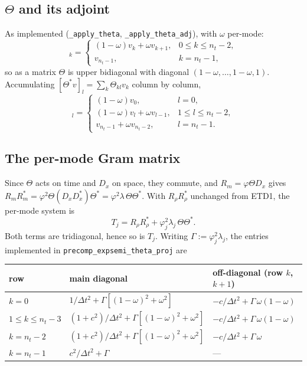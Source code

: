 \documentclass[11pt]{article}
\newcommand{\dt}{\Delta t}
\newcommand{\code}[1]{\texttt{#1}}
\begin{document}
\subsection{$\Theta$ and its adjoint}

As implemented (\code{\_apply\_theta}, \code{\_apply\_theta\_adj}), with $\omega$
per-mode:
\begin{equation}
  [\Theta v]_k =
  \begin{cases}
    (1-\omega)v_k + \omega v_{k+1}, & 0\le k\le n_t-2,\\[2pt]
    v_{n_t-1},                      & k=n_t-1,
  \end{cases}
  \label{eq:Theta}
\end{equation}
so as a matrix $\Theta$ is upper bidiagonal with diagonal
$(1-\omega,\dots,1-\omega,1)$. Accumulating $[\Theta^*v]_l=\sum_k\Theta_{kl}v_k$ column
by column,
\begin{equation}
  [\Theta^*v]_l =
  \begin{cases}
    (1-\omega)v_0,                        & l=0,\\[2pt]
    (1-\omega)v_l + \omega v_{l-1},       & 1\le l\le n_t-2,\\[2pt]
    v_{n_t-1} + \omega v_{n_t-2},         & l=n_t-1.
  \end{cases}
  \label{eq:ThetaStar}
\end{equation}

\subsection{The per-mode Gram matrix}

Since $\Theta$ acts on time and $D_x$ on space, they commute, and $R_m=\varphi\Theta D_x$
gives $R_mR_m^*=\varphi^2\Theta(D_xD_x^*)\Theta^*=\varphi^2\lambda\,\Theta\Theta^*$. With
$R_\rho R_\rho^*$ unchanged from ETD1, the per-mode system is
\begin{equation}
  T_j = R_\rho R_\rho^* + \varphi_j^2\lambda_j\,\Theta\Theta^* .
  \label{eq:gram}
\end{equation}
Both terms are tridiagonal, hence so is $T_j$. Writing $\Gamma:=\varphi_j^2\lambda_j$,
the entries implemented in \code{precomp\_expsemi\_theta\_proj} are

\begin{center}
\begin{tabular}{@{}lll@{}}
\toprule
row & main diagonal & off-diagonal (row $k$, $k{+}1$) \\
\midrule
$k=0$              & $1/\dt^2 + \Gamma[(1-\omega)^2+\omega^2]$
                   & $-c/\dt^2 + \Gamma\,\omega(1-\omega)$ \\
$1\le k\le n_t-3$  & $(1+c^2)/\dt^2 + \Gamma[(1-\omega)^2+\omega^2]$
                   & $-c/\dt^2 + \Gamma\,\omega(1-\omega)$ \\
$k=n_t-2$          & $(1+c^2)/\dt^2 + \Gamma[(1-\omega)^2+\omega^2]$
                   & $-c/\dt^2 + \Gamma\,\omega$ \\
$k=n_t-1$          & $c^2/\dt^2 + \Gamma$
                   & --- \\
\bottomrule
\end{tabular}
\end{center}
\end{document}

